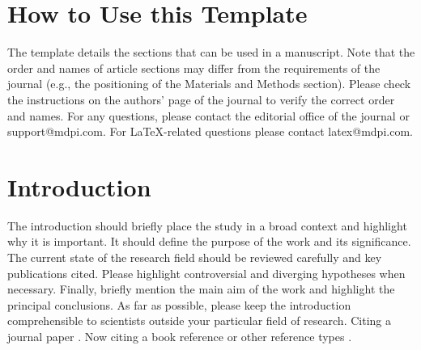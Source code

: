 \setcounter{section}{-1} %
\section{How to Use this Template}

The template details the sections that can be used in a manuscript. Note that the order and names of article sections may differ from the requirements of the journal (e.g., the positioning of the Materials and Methods section). Please check the instructions on the authors' page of the journal to verify the correct order and names. For any questions, please contact the editorial office of the journal or support@mdpi.com. For LaTeX-related questions please contact latex@mdpi.com.

\section{Introduction}

The introduction should briefly place the study in a broad context and highlight why it is important. It should define the purpose of the work and its significance. The current state of the research field should be reviewed carefully and key publications cited. Please highlight controversial and diverging hypotheses when necessary. Finally, briefly mention the main aim of the work and highlight the principal conclusions. As far as possible, please keep the introduction comprehensible to scientists outside your particular field of research. Citing a journal paper \cite{wagner2017optimization} . Now citing a book reference \cite{blair2005sam} or other reference types \cite{hirsch2011standardization}. %
 

